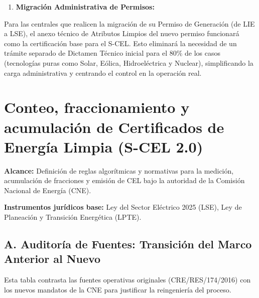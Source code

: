 \documentclass{cel}
\begin{document}
\begin{enumerate}
\item \textbf{Migración Administrativa de Permisos:}
\end{enumerate}
Para las centrales que realicen la migración de su Permiso de Generación (de LIE a LSE), el anexo técnico de \textquotedbl{}Atributos Limpios\textquotedbl{} del nuevo permiso funcionará como la certificación base para el S-CEL. Esto eliminará la necesidad de un trámite separado de \textquotedbl{}Dictamen Técnico\textquotedbl{} inicial para el 80\% de los casos (tecnologías puras como Solar, Eólica, Hidroeléctrica y Nuclear), simplificando la carga administrativa y centrando el control en la operación real.


{}
\section*{Conteo, fraccionamiento y acumulación de Certificados de Energía Limpia (S-CEL 2.0)}
\nopagebreak

\textbf{Alcance:} Definición de reglas algorítmicas y normativas para la medición, acumulación de fracciones y emisión de CEL bajo la autoridad de la Comisión Nacional de Energía (CNE).

\textbf{Instrumentos jurídicos base:} Ley del Sector Eléctrico 2025 (LSE), Ley de Planeación y Transición Energética (LPTE).


\subsection{A. Auditoría de Fuentes: Transición del Marco Anterior al Nuevo}
\nopagebreak

Esta tabla contrasta las fuentes operativas originales (CRE/RES/174/2016) con los nuevos mandatos de la CNE para justificar la reingeniería del proceso.
\end{document}
